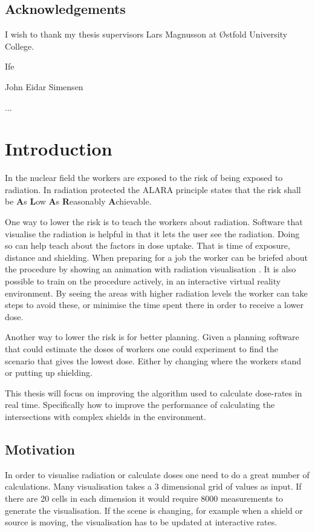 \documentclass[11pt,twoside,a4paper]{report}
\begin{document}
\section{Acknowledgements}
I wish to thank my thesis supervisors Lars Magnusson at Østfold University College.

Ife

John Eidar Simensen

...

\tableofcontents

\chapter{Introduction}
In the nuclear field the workers are exposed to the risk of being exposed to radiation. In radiation protected the ALARA principle states that the risk shall be \textbf{A}s \textbf{L}ow \textbf{A}s \textbf{R}easonably \textbf{A}chievable. 

One way to lower the risk is to teach the workers about radiation. Software that visualise the radiation is helpful in that it lets the user see the radiation. Doing so can help teach about the factors in dose uptake. That is time of exposure, distance and shielding. When preparing for a job the worker can be briefed about the procedure by showing an animation with radiation visualisation \cite{szHoke2014comprehensive}. It is also possible to train on the procedure actively, in an interactive virtual reality environment. By seeing the areas with higher radiation levels the worker can take steps to avoid these, or minimise the time spent there in order to receive a lower dose. 

Another way to lower the risk is for better planning. Given a planning software that could estimate the doses of workers one could experiment to find the scenario that gives the lowest dose. Either by changing where the workers stand or putting up shielding.

This thesis will focus on improving the algorithm used to calculate dose-rates in real time. Specifically how to improve the performance of calculating the intersections with complex shields in the environment.

\section{Motivation}
In order to visualise radiation or calculate doses one need to do a great number of calculations. Many visualisation takes a 3 dimensional grid of values as input. If there are 20 cells in each dimension it would require 8000 measurements to generate the visualisation. If the scene is changing, for example when a shield or source is moving, the visualisation has to be updated at interactive rates. 
\end{document}
